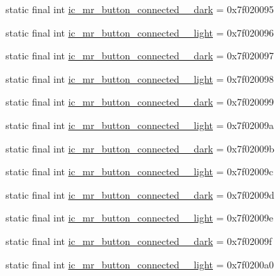 \begin{CompactItemize}
\item 
static final int \hyperlink{classandroid_1_1support_1_1v7_1_1appcompat_1_1_r_1_1drawable_c44dfe9b5a61f92a72e2fdca85a940a0}{ic\_\-mr\_\-button\_\-connected\_\_\-dark} = 0x7f020095
\item 
static final int \hyperlink{classandroid_1_1support_1_1v7_1_1appcompat_1_1_r_1_1drawable_c9e4b4539a387532b4ab64a43a617bc3}{ic\_\-mr\_\-button\_\-connected\_\_\-light} = 0x7f020096
\item 
static final int \hyperlink{classandroid_1_1support_1_1v7_1_1appcompat_1_1_r_1_1drawable_a3f156ab4650ef4ba0dae06813266350}{ic\_\-mr\_\-button\_\-connected\_\_\-dark} = 0x7f020097
\item 
static final int \hyperlink{classandroid_1_1support_1_1v7_1_1appcompat_1_1_r_1_1drawable_970a3560cb780fc5ee11a0e9a22b711d}{ic\_\-mr\_\-button\_\-connected\_\_\-light} = 0x7f020098
\item 
static final int \hyperlink{classandroid_1_1support_1_1v7_1_1appcompat_1_1_r_1_1drawable_aed4903eacc2edc5790826d52316a3da}{ic\_\-mr\_\-button\_\-connected\_\_\-dark} = 0x7f020099
\item 
static final int \hyperlink{classandroid_1_1support_1_1v7_1_1appcompat_1_1_r_1_1drawable_b880c3251ec0810f7aa54266ad1af992}{ic\_\-mr\_\-button\_\-connected\_\_\-light} = 0x7f02009a
\item 
static final int \hyperlink{classandroid_1_1support_1_1v7_1_1appcompat_1_1_r_1_1drawable_9f5e28a4b0915348df34a9a9410cd077}{ic\_\-mr\_\-button\_\-connected\_\_\-dark} = 0x7f02009b
\item 
static final int \hyperlink{classandroid_1_1support_1_1v7_1_1appcompat_1_1_r_1_1drawable_ee068443192e61a1ed1f29fab71cbe06}{ic\_\-mr\_\-button\_\-connected\_\_\-light} = 0x7f02009c
\item 
static final int \hyperlink{classandroid_1_1support_1_1v7_1_1appcompat_1_1_r_1_1drawable_359ba4599ab541b6afa099580d0d9a95}{ic\_\-mr\_\-button\_\-connected\_\_\-dark} = 0x7f02009d
\item 
static final int \hyperlink{classandroid_1_1support_1_1v7_1_1appcompat_1_1_r_1_1drawable_909e1602f5b99743357de5e78b25aa19}{ic\_\-mr\_\-button\_\-connected\_\_\-light} = 0x7f02009e
\item 
static final int \hyperlink{classandroid_1_1support_1_1v7_1_1appcompat_1_1_r_1_1drawable_3ea72b7d58fea5ccc9a1cb660152d2aa}{ic\_\-mr\_\-button\_\-connected\_\_\-dark} = 0x7f02009f
\item 
static final int \hyperlink{classandroid_1_1support_1_1v7_1_1appcompat_1_1_r_1_1drawable_e405145b59c6846b3394060f7139523c}{ic\_\-mr\_\-button\_\-connected\_\_\-light} = 0x7f0200a0

\end{CompactItemize}
